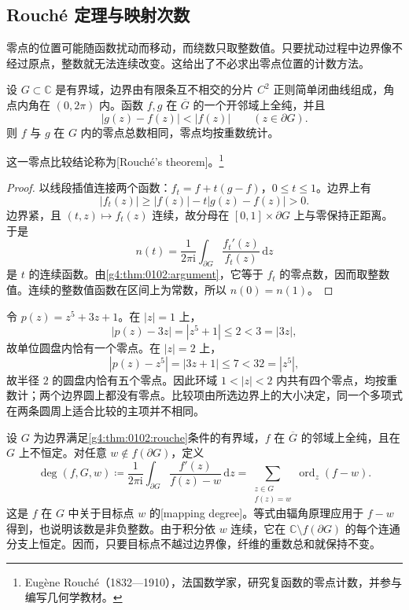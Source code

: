 \subsection{Rouché 定理与映射次数}
\label{g4:subsec:0102:03}
零点的位置可能随函数扰动而移动，而绕数只取整数值。只要扰动过程中边界像不经过原点，整数就无法连续改变。这给出了不必求出零点位置的计数方法。

\begin{theorem}[Rouché 定理]\label{g4:thm:0102:rouche}
	设 \(G\subset\mathbb C\) 是有界域，边界由有限条互不相交的分片 \(C^2\) 正则简单闭曲线组成，角点内角在 \((0,2\pi)\) 内。函数 \(f,g\) 在 \(\overline G\) 的一个开邻域上全纯，并且
	\[
		|g(z)-f(z)|<|f(z)|\qquad(z\in\partial G).
	\]
	则 \(f\) 与 \(g\) 在 \(G\) 内的零点总数相同，零点均按重数统计。
\end{theorem}
这一零点比较结论称为[Rouché's theorem]。\footnote{Eugène Rouché（1832—1910），法国数学家，研究复函数的零点计数，并参与编写几何学教材。}
\begin{proof}
	以线段插值连接两个函数：\(f_t=f+t(g-f)\)，\(0\leq t\leq1\)。边界上有
	\[
		|f_t(z)|\geq|f(z)|-t|g(z)-f(z)|>0.
	\]
	边界紧，且 \((t,z)\mapsto f_t(z)\) 连续，故分母在 \([0,1]\times\partial G\) 上与零保持正距离。于是
	\[
		n(t)=\frac{1}{2\pi\mathrm{i}}\int_{\partial G}\frac{f_t'(z)}{f_t(z)}\,\mathrm{d}z
	\]
	是 \(t\) 的连续函数。由\cref{g4:thm:0102:argument}，它等于 \(f_t\) 的零点数，因而取整数值。连续的整数值函数在区间上为常数，所以 \(n(0)=n(1)\)。
\end{proof}

\begin{example}\label{g4:exm:0102:rouche-polynomial}
	令 \(p(z)=z^5+3z+1\)。在 \(|z|=1\) 上，
	\[
		|p(z)-3z|=|z^5+1|\leq2<3=|3z|,
	\]
	故单位圆盘内恰有一个零点。在 \(|z|=2\) 上，
	\[
		|p(z)-z^5|=|3z+1|\leq7<32=|z^5|,
	\]
	故半径 \(2\) 的圆盘内恰有五个零点。因此环域 \(1<|z|<2\) 内共有四个零点，均按重数计；两个边界圆上都没有零点。比较项由所选边界上的大小决定，同一个多项式在两条圆周上适合比较的主项并不相同。
\end{example}

设 \(G\) 为边界满足\cref{g4:thm:0102:rouche}条件的有界域，\(f\) 在 \(\overline G\) 的邻域上全纯，且在 \(G\) 上不恒定。对任意 \(w\notin f(\partial G)\)，定义
\begin{equation}\label{g4:eq:0102:degree}
	\deg(f,G,w)\coloneqq
	\frac{1}{2\pi\mathrm{i}}\int_{\partial G}\frac{f'(z)}{f(z)-w}\,\mathrm{d}z
	=\sum_{\substack{z\in G\\f(z)=w}}\operatorname{ord}_z(f-w).
\end{equation}
这是 \(f\) 在 \(G\) 中关于目标点 \(w\) 的[mapping degree]。等式由辐角原理应用于 \(f-w\) 得到，也说明该数是非负整数。由于积分依 \(w\) 连续，它在 \(\mathbb C\setminus f(\partial G)\) 的每个连通分支上恒定。因而，只要目标点不越过边界像，纤维的重数总和就保持不变。

